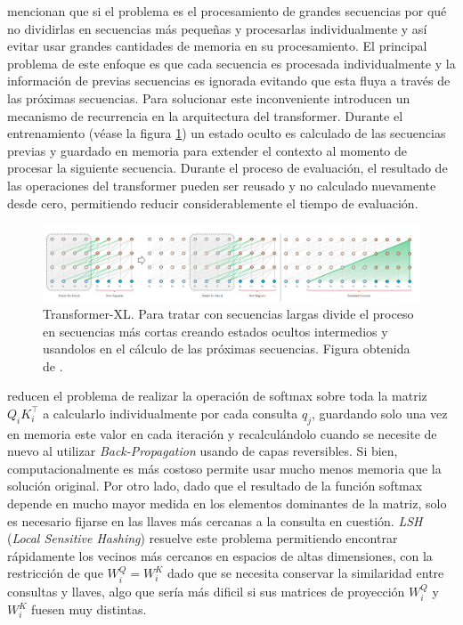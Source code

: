\citeauthor{DBLP:journals/corr/abs-1901-02860} mencionan que si el problema es el procesamiento de
grandes secuencias por qué no dividirlas en secuencias más pequeñas y procesarlas individualmente
y así evitar usar grandes cantidades de memoria en su procesamiento. El principal problema de este
enfoque es que cada secuencia es procesada individualmente y la información de previas secuencias es
ignorada evitando que esta fluya a través de las próximas secuencias. Para solucionar este
inconveniente introducen un mecanismo de recurrencia en la arquitectura del transformer. Durante el
entrenamiento (véase la figura \ref{fig:trans-xl}) un estado oculto es calculado de las secuencias previas y guardado
en memoria para extender el contexto al momento de procesar la siguiente secuencia. Durante el
proceso de evaluación, el resultado de las operaciones del transformer pueden ser reusado y no
calculado nuevamente desde cero, permitiendo reducir considerablemente el tiempo de evaluación.

\begin{figure}[ht!]
    \centering
    \includegraphics[width=0.8 \textwidth]{Chapters/2. Transformer/Figures/transformer/trans-XL.png}
    \caption{Transformer-XL. Para tratar con secuencias largas divide el proceso en secuencias más
             cortas creando estados ocultos intermedios y usandolos en el cálculo de las próximas
             secuencias. Figura obtenida de \cite{DBLP:journals/corr/abs-1901-02860}.}
    \label{fig:trans-xl}
\end{figure}

\citeauthor{DBLP:journals/corr/abs-2001-04451} reducen el problema de realizar la operación de softmax
sobre toda la matriz $Q_i K_i^\top$ a calcularlo individualmente por cada consulta $q_j$, guardando
solo una vez en memoria este valor en cada iteración y recalculándolo cuando se necesite de nuevo
al utilizar \textit{Back-Propagation} usando de capas reversibles. Si bien, computacionalmente es
más costoso permite usar mucho
menos memoria que la solución original. Por otro lado, dado que el resultado de la función softmax
depende en mucho mayor medida en los elementos dominantes de la matriz, solo es necesario fijarse en
las llaves más cercanas a la consulta en cuestión. \textit{LSH} (\textit{Local Sensitive Hashing})
resuelve este problema permitiendo encontrar rápidamente los vecinos más cercanos en espacios de altas
dimensiones, con la  restricción de que $W_i^Q = W_i^K$ dado que se necesita conservar la
similaridad entre consultas y llaves, algo que sería más dificil si sus matrices de proyección
$W_i^Q$ y $W_i^K$ fuesen muy distintas.

